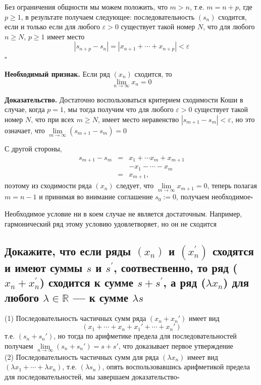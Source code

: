 \documentclass[a4paper]{article}
\newcommand{\qed}{\hfill$\square$}
\begin{document}
Без ограничения общности мы можем положить, что $m>n$, т.е. $m= n+p$, где $p \ge 1$, в результате получаем следующее: последовательность $(s_n)$ сходится, если и только если для любого $\varepsilon >0$ существует такой номер $N$, что для любого $n \ge N$, $p \ge 1$ имеет место
$$
|s_{n+p} - s_n| = |x_{n+1} + \cdots+  x_{n+p}| < \varepsilon
$$\qed

\textbf{Необходимый признак.} Если ряд $(x_n)$ сходится, то 
$$
\lim_{n \to \infty} x_n =0
$$

\textbf{Доказательство.} Достаточно воспользоваться критерием сходимости Коши в случае, когда $p=1$, мы тогда получим что для любого $\varepsilon >0$ существует такой номер $N$, что при всех $m \ge N$, имеет место неравенство $|s_{m+1} - s_m| < \varepsilon$, но это означает, что $\lim\limits_{m \to \infty} (s_{m+1} - s_m)=0$

С другой стороны, 
$$\begin{aligned}
s_{m+1} -s_m &=& x_1 + \cdots x_m + x_{m+1} \\
&& - x_1 - \cdots - x_m \\
&=& x_{m+1},
\end{aligned}$$
поэтому из сходимости ряда $(x_n)$ следует, что $\lim\limits_{m\to \infty }x_{m+1} = 0$, теперь полагая $m = n-1$ и принимая во внимание соглашение $s_0 :=0$, получаем необходимое\qed

Необходимое условие ни в коем случае не является достаточным. Например, гармонический ряд этому условию удовлетворяет, но он не сходится

\subsection{Докажите, что если ряды $\left(x_{n}\right)$ и $\left(x_{n}^{\prime}\right)$ сходятся и имеют суммы $s$ и $s^{\prime}$, соотвественно, то ряд ($x_{n}+x_{n}^{\prime}$) сходится к сумме $s+s^{\prime}$, а ряд ($\lambda x_{n}$) для любого $\lambda \in \mathbb{R}$ — к сумме $\lambda s$}
(1) Последовательность частичных сумм ряда $(x_n + x_n')$ имеет вид 
$$
(x_1 + \cdots + x_n + x_1' + \cdots +x_n')
$$
т.е. $(s_n + s_n')$, но тогда по арифметике предела для последовательностей получаем $\lim\limits_{n \to \infty} (s_n + s_n') = s+ s'$, что доказывает первое утверждение\\[2mm]

(2) Последовательность частичных сумм для ряда $(\lambda x_n)$ имеет вид $(\lambda x_1 + \cdots + \lambda x_n)$, т.е. $(\lambda s_n)$, опять воспользовавшись арифметикой предела для последовательностей, мы завершаем доказательство\qed
\label{2.17}
\end{document}

